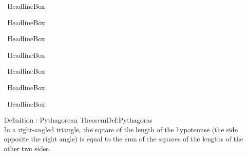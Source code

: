 					\allmycounters
					\begin{mybox}{\currentboxsection \ Headline}{Box \theboxcount} \\
						\allmycounters
					\end{mybox}
					\begin{mybox}{\currentboxsection \ Headline}{Box \theboxcount} \\
						\allmycounters
					\end{mybox}
					
						\allmycounters
						\begin{mybox}{\currentboxsection \ Headline}{Box \theboxcount} \\
							\allmycounters
						\end{mybox}
						\begin{mybox}{\currentboxsection \ Headline}{Box \theboxcount} \\
							\allmycounters
						\end{mybox}
						\begin{mybox}{\currentboxsection \ Headline}{Box \theboxcount} \\
							\allmycounters
						\end{mybox}

				\allmycounters
				\begin{mybox}{\currentboxsection \ Headline}{Box \theboxcount} \\
					\allmycounters
				\end{mybox}
				\begin{mybox}{\currentboxsection \ Headline}{Box \theboxcount} \\
				\allmycounters
				\end{mybox}
				
	\begin{definition}{Definition \currentboxsection: Pythagorean Theorem}{Def:Pythagoras} \label{def:Pythagoras} \\
		In a right-angled triangle, the square of the length of the hypotenuse (the side opposite the right angle) is equal to the sum of the squares of the lengths of the other two sides.
	\end{definition}		
	
